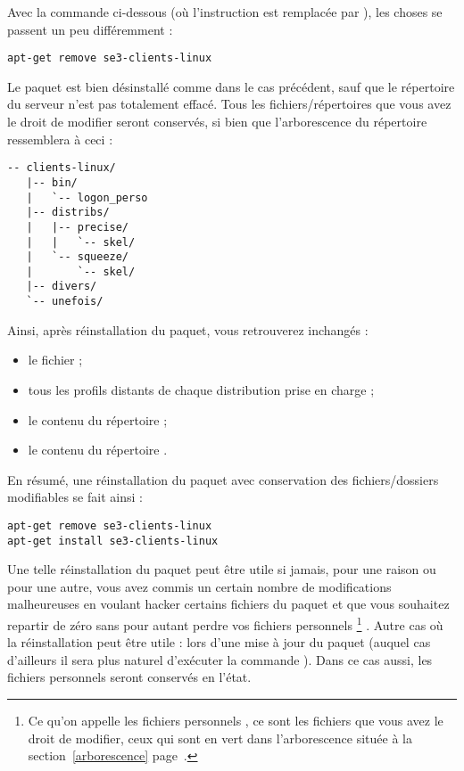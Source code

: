 Avec la commande ci-dessous (où l'instruction 
est remplacée par ), les choses se passent un peu différemment :
%
\begin{lstlisting}
apt-get remove se3-clients-linux
\end{lstlisting}
%
Le paquet  est bien désinstallé
comme dans le cas précédent, sauf que le répertoire 
 du serveur n'est
pas totalement effacé. Tous les fichiers/répertoires que
vous avez le droit de modifier seront conservés, si
bien que l'arborescence du répertoire ressemblera à ceci :
%
\begin{lstlisting}[emph={logon_perso,skel,unefois,divers},emphstyle={\color{green}\textbf}]
-- clients-linux/
   |-- bin/
   |   `-- logon_perso
   |-- distribs/
   |   |-- precise/
   |   |   `-- skel/
   |   `-- squeeze/
   |       `-- skel/
   |-- divers/
   `-- unefois/
\end{lstlisting}
%
Ainsi, après réinstallation du paquet, vous retrouverez inchangés :
%
\begin{itemize}
\item le fichier  ;
\item tous les profils distants de chaque distribution 
prise en charge ;
\item le contenu du répertoire  ;
\item le contenu du répertoire .
\end{itemize}
%
En résumé, une réinstallation du paquet 
avec conservation des fichiers/dossiers modifiables se fait ainsi :
%
\begin{lstlisting}
apt-get remove se3-clients-linux
apt-get install se3-clients-linux
\end{lstlisting}
%
Une telle réinstallation du paquet peut être utile si jamais,
pour une raison ou pour une autre,
vous avez commis un certain nombre de modifications malheureuses 
en voulant \og hacker \fg{} certains fichiers du paquet et que vous souhaitez
repartir de zéro sans pour autant perdre vos fichiers \og personnels%
%
\footnote{Ce qu'on appelle les fichiers \og personnels \fg{}, 
ce sont les fichiers que vous avez le droit de modifier, ceux qui
sont en vert dans l'arborescence située à la section~\ref{arborescence}
page~\pageref{arborescence}.}
%
\fg{}.
Autre cas où la réinstallation peut être utile : lors d'une mise à jour
du paquet (auquel cas d'ailleurs il sera plus naturel d'exécuter la commande
\og {} \fg{}). Dans ce cas aussi, les
fichiers \og personnels \fg{} seront conservés en l'état.


